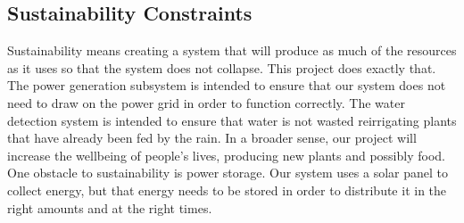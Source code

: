 \subsection{Sustainability Constraints}
Sustainability means creating a system that will produce as much of the resources as it uses so that the system does not collapse. This project does exactly that. The power generation subsystem is intended to ensure that our system does not need to draw on the power grid in order to function correctly. The water detection system is intended to ensure that water is not wasted reirrigating plants that have already been fed by the rain. In a broader sense, our project will increase the wellbeing of people’s lives, producing new plants and possibly food.
One obstacle to sustainability is power storage. Our system uses a solar panel to collect energy, but that energy needs to be stored in order to distribute it in the right amounts and at the right times. 
